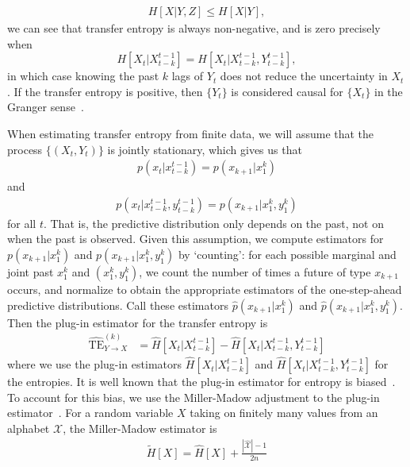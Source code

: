 \documentclass[10pt,letterpaper]{article}
\begin{document}
\begin{align}
	H[X | Y, Z] \leq H[X | Y],
\end{align}
we can see that transfer entropy is always non-negative, and is zero precisely when $$H\left[X_{t} | X_{t-k}^{t-1}\right] = H\left[X_{t} | X_{t-k}^{t-1}, Y_{t-k}^{t-1}\right],$$ in which case knowing the past $k$ lags of $Y_{t}$ does not reduce the uncertainty in $X_{t}$. If the transfer entropy is positive, then $\{ Y_{t}\}$ is considered causal for $\{ X_{t}\}$ in the Granger sense~\cite{granger1963economic}.

When estimating transfer entropy from finite data, we will assume that the process $\{(X_{t}, Y_{t})\}$ is jointly stationary, which gives us that
\begin{align}
	p(x_{t} | x_{t-k}^{t-1}) = p(x_{k+1} | x_{1}^{k})
\end{align}
and
\begin{align}
	p(x_{t} | x_{t-k}^{t-1}, y_{t-k}^{t-1}) = p(x_{k+1} | x_{1}^{k}, y_{1}^{k})
\end{align}
for all $t$. That is, the predictive distribution only depends on the past, not on when the past is observed. Given this assumption, we compute estimators for $p(x_{k+1} | x_{1}^{k})$ and $p(x_{k+1} | x_{1}^{k}, y_{1}^{k})$ by `counting': for each possible marginal and joint past $x_{1}^{k}$ and $(x_{1}^{k}, y_{1}^{k})$, we count the number of times a future of type $x_{k+1}$ occurs, and normalize to obtain the appropriate estimators of the one-step-ahead predictive distributions. Call these estimators $\hat{p}(x_{k+1} | x_{1}^{k})$ and $\hat{p}(x_{k+1} | x_{1}^{k}, y_{1}^{k})$. Then the plug-in estimator for the transfer entropy is
\begin{align}
	\widehat{\text{TE}}_{Y \to X}^{(k)} &= \hat{H}\left[X_{t} | X_{t-k}^{t-1}\right] - \hat{H}\left[X_{t} | X_{t-k}^{t-1}, Y_{t-k}^{t-1}\right]
\end{align}
where we use the plug-in estimators $\hat{H}\left[X_{t} | X_{t-k}^{t-1}\right]$ and $\hat{H}\left[X_{t} | X_{t-k}^{t-1}, Y_{t-k}^{t-1}\right]$ for the entropies. It is well known that the plug-in estimator for entropy is biased~\cite{paninski2003estimation}. To account for this bias, we use the Miller-Madow adjustment to the plug-in estimator~\cite{miller1955note}. For a random variable $X$ taking on finitely many values from an alphabet $\mathcal{X}$, the Miller-Madow estimator is
	\begin{align}
		\tilde{H}[X] = \hat{H}[X] + \frac{|\hat{\mathcal{X}}| - 1}{2 n}
	\end{align}
\end{document}
